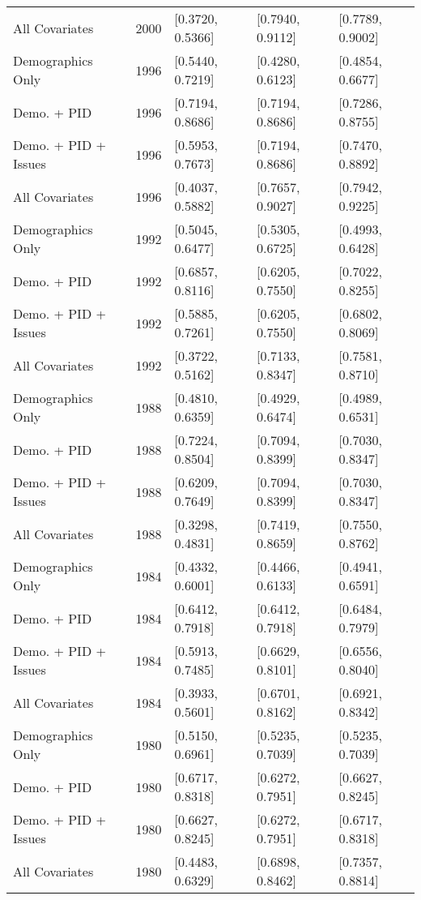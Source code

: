 \begin{longtable}{lrlll}
  All Covariates & 2000 & [0.3720, 0.5366] & [0.7940, 0.9112] & [0.7789, 0.9002] \\ 
  Demographics Only & 1996 & [0.5440, 0.7219] & [0.4280, 0.6123] & [0.4854, 0.6677] \\ 
  Demo. + PID & 1996 & [0.7194, 0.8686] & [0.7194, 0.8686] & [0.7286, 0.8755] \\ 
  Demo. + PID + Issues & 1996 & [0.5953, 0.7673] & [0.7194, 0.8686] & [0.7470, 0.8892] \\ 
  All Covariates & 1996 & [0.4037, 0.5882] & [0.7657, 0.9027] & [0.7942, 0.9225] \\ 
  Demographics Only & 1992 & [0.5045, 0.6477] & [0.5305, 0.6725] & [0.4993, 0.6428] \\ 
  Demo. + PID & 1992 & [0.6857, 0.8116] & [0.6205, 0.7550] & [0.7022, 0.8255] \\ 
  Demo. + PID + Issues & 1992 & [0.5885, 0.7261] & [0.6205, 0.7550] & [0.6802, 0.8069] \\ 
  All Covariates & 1992 & [0.3722, 0.5162] & [0.7133, 0.8347] & [0.7581, 0.8710] \\ 
  Demographics Only & 1988 & [0.4810, 0.6359] & [0.4929, 0.6474] & [0.4989, 0.6531] \\ 
  Demo. + PID & 1988 & [0.7224, 0.8504] & [0.7094, 0.8399] & [0.7030, 0.8347] \\ 
  Demo. + PID + Issues & 1988 & [0.6209, 0.7649] & [0.7094, 0.8399] & [0.7030, 0.8347] \\ 
  All Covariates & 1988 & [0.3298, 0.4831] & [0.7419, 0.8659] & [0.7550, 0.8762] \\ 
  Demographics Only & 1984 & [0.4332, 0.6001] & [0.4466, 0.6133] & [0.4941, 0.6591] \\ 
  Demo. + PID & 1984 & [0.6412, 0.7918] & [0.6412, 0.7918] & [0.6484, 0.7979] \\ 
  Demo. + PID + Issues & 1984 & [0.5913, 0.7485] & [0.6629, 0.8101] & [0.6556, 0.8040] \\ 
  All Covariates & 1984 & [0.3933, 0.5601] & [0.6701, 0.8162] & [0.6921, 0.8342] \\ 
  Demographics Only & 1980 & [0.5150, 0.6961] & [0.5235, 0.7039] & [0.5235, 0.7039] \\ 
  Demo. + PID & 1980 & [0.6717, 0.8318] & [0.6272, 0.7951] & [0.6627, 0.8245] \\ 
  Demo. + PID + Issues & 1980 & [0.6627, 0.8245] & [0.6272, 0.7951] & [0.6717, 0.8318] \\ 
  All Covariates & 1980 & [0.4483, 0.6329] & [0.6898, 0.8462] & [0.7357, 0.8814] \\ 

\end{longtable}
